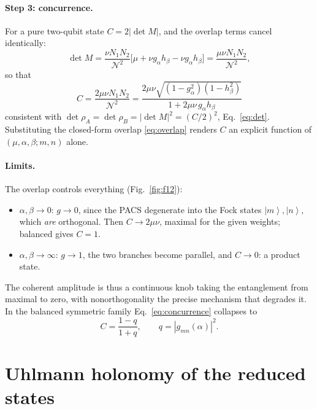 \documentclass[11pt]{article}
\newcommand{\ket}[1]{\left|#1\right\rangle}
\begin{document}
\paragraph{Step 3: concurrence.} For a pure two-qubit state $C=2|\det M|$, and
the overlap terms cancel identically:
\begin{equation}
\det M=\frac{\nu N_1N_2}{\mathcal N^2}
\big[\mu+\nu g_\alpha h_\beta-\nu g_\alpha h_\beta\big]
=\frac{\mu\nu N_1N_2}{\mathcal N^2} ,
\end{equation}
so that
\begin{equation}
\boxed{\;C=\frac{2\mu\nu N_1N_2}{\mathcal N^2}
=\frac{2\mu\nu\sqrt{(1-g_\alpha^2)(1-h_\beta^2)}}
{1+2\mu\nu\,g_\alpha h_\beta}\;}
\label{eq:concurrence}
\end{equation}
consistent with $\det\rho_A=\det\rho_B=|\det M|^2=(C/2)^2$,
Eq.~\eqref{eq:det}. Substituting the closed-form overlap \eqref{eq:overlap}
renders $C$ an explicit function of $(\mu,\alpha,\beta;m,n)$ alone.

\paragraph{Limits.} The overlap controls everything (Fig.~\ref{fig:f12}):
\begin{itemize}[nosep]
\item $\alpha,\beta\to0$: $g\to0$, since the PACS degenerate into the Fock
      states $\ket{m},\ket{n}$, which \emph{are} orthogonal. Then
      $C\to2\mu\nu$, maximal for the given weights; balanced gives $C=1$.
\item $\alpha,\beta\to\infty$: $g\to1$, the two branches become parallel, and
      $C\to0$: a product state.
\end{itemize}
The coherent amplitude is thus a continuous knob taking the entanglement from
maximal to zero, with nonorthogonality the precise mechanism that degrades it.
In the balanced symmetric family Eq.~\eqref{eq:concurrence} collapses to
\begin{equation}
C=\frac{1-q}{1+q},\qquad q=|g_{mn}(\alpha)|^2 .
\label{eq:C-sym}
\end{equation}

\section{Uhlmann holonomy of the reduced states}
\label{sec:uhlmann}
\end{document}
